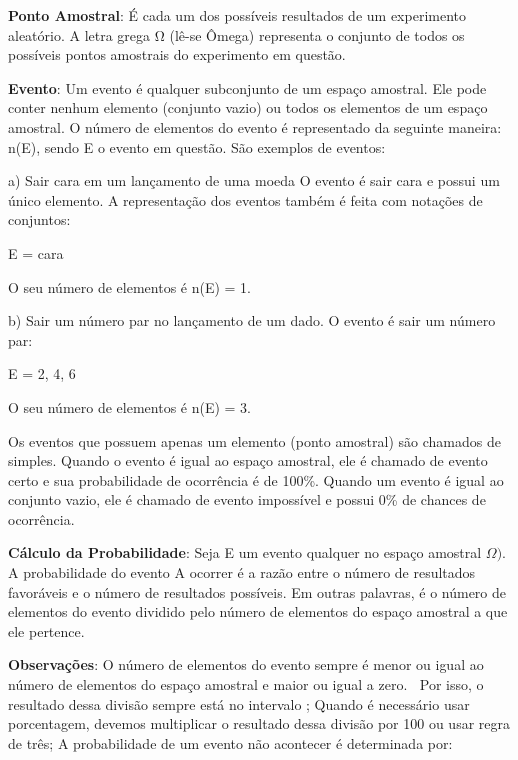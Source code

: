 \begin{multicols*}{2}
	\textbf{Ponto Amostral}: É cada um dos possíveis resultados de um experimento aleatório.
A letra grega Ω (lê-se Ômega) representa o conjunto de todos os possíveis pontos amostrais do experimento em questão.

	\textbf{Evento}: Um evento é qualquer subconjunto de um espaço amostral. Ele pode conter nenhum elemento (conjunto vazio) ou todos os elementos de um espaço amostral. O número de elementos do evento é representado da seguinte maneira: n(E), sendo E o evento em questão. São exemplos de eventos:
	
a) Sair cara em um lançamento de uma moeda O evento é sair cara e possui um único elemento. A representação dos eventos também é feita com notações de conjuntos:

E = {cara}

O seu número de elementos é n(E) = 1.

b) Sair um número par no lançamento de um dado. O evento é sair um número par:

E = {2, 4, 6}

O seu número de elementos é n(E) = 3.

Os eventos que possuem apenas um elemento (ponto amostral) são chamados de simples. Quando o evento é igual ao espaço amostral, ele é chamado de evento certo e sua probabilidade de ocorrência é de 100\%. Quando um evento é igual ao conjunto vazio, ele é chamado de evento impossível e possui 0\% de chances de ocorrência.

	\textbf{Cálculo da Probabilidade}: Seja E um evento qualquer no espaço amostral $\Omega)$. A probabilidade do evento A ocorrer é a razão entre o número de resultados favoráveis e o número de resultados possíveis. Em outras palavras, é o número de elementos do evento dividido pelo número de elementos do espaço amostral a que ele pertence.
	

\textbf{Observações}:  O número de elementos do evento sempre é menor ou igual ao número de elementos do espaço amostral e maior ou igual a zero. $ \ $ Por isso, o resultado dessa divisão sempre está no intervalo ; Quando é necessário usar porcentagem, devemos multiplicar o resultado dessa divisão por 100 ou usar regra de três;
A probabilidade de um evento não acontecer é determinada por:


	
	

\end{multicols*}

